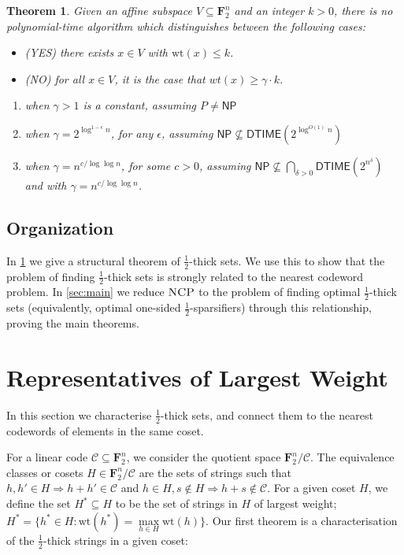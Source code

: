 \documentclass{article}
\newtheorem{theorem}{Theorem}
\newcommand{\NP}{\mathsf{NP}}
\newcommand{\DTIME}{\mathsf{DTIME}}
\newcommand{\FF}{\mathbf{F}}
\newcommand{\NCP}{\textsc{NCP}}
\newcommand{\calC}{\mathcal{C}}
\newcommand{\wt}{\text{wt}}
\begin{document}
\begin{theorem}\label{thm:ncphard}
Given an affine subspace $V \subseteq \FF_2^n$ and an integer $k>0$, there is no polynomial-time algorithm which distinguishes between the following cases:

\begin{itemize}
    \item (YES) there exists $x \in V$ with $\wt(x) \leq k$.
    \item (NO) for all $x \in V$, it is the case that $wt(x) \geq \gamma \cdot k$.
\end{itemize}

\begin{enumerate}
    \item when $\gamma>1$ is a constant, assuming $P\neq \NP$
    \item when $\gamma=2^{\log^{1-\epsilon}n}$,  for any $\epsilon$, assuming $\NP\not \subseteq \DTIME(2^{\log^{O(1)}n})$
    \item when  $\gamma = n^{c/\log\log n}$, for some $c>0$, assuming 
    $\NP \nsubseteq \bigcap_{\delta > 0} \DTIME(2^{n^\delta})$ and with $\gamma = n^{c/\log\log n}$.
\end{enumerate}
\end{theorem}


\subsection{Organization}\label{sec:organization}
In \cref{sec:structure} we give a structural theorem of $\frac12$-thick sets. We use this to show that the problem of finding $\frac12$-thick sets is strongly related to the nearest codeword problem. In \cref{sec:main} we reduce $\NCP$ to the problem of finding optimal $\frac12$-thick sets (equivalently, optimal one-sided $\frac12$-sparsifiers) through this relationship, proving the main theorems.

\section{Representatives of Largest Weight}\label{sec:structure}
In this section we characterise $\frac12$-thick sets, and connect them to the nearest codewords of elements in the same coset.

For a linear code $\calC \subseteq \FF_2^n$, we consider the quotient space $\FF_2^n/\calC$. The equivalence classes or cosets $H \in \FF_2^n/\calC$ are the sets of strings such that $h, h' \in H \Rightarrow h + h' \in \calC$ and $h \in H, s \notin H \Rightarrow h + s \notin \calC$. For a given coset $H$, we define the set $H^* \subseteq H$ to be the set of strings in $H$ of largest weight; $H^* = \{h^* \in H : \wt(h^*) = \max\limits_{h\in H}\wt(h)\}$. Our first theorem is a characterisation of the $\frac12$-thick strings in a given coset:
\end{document}
